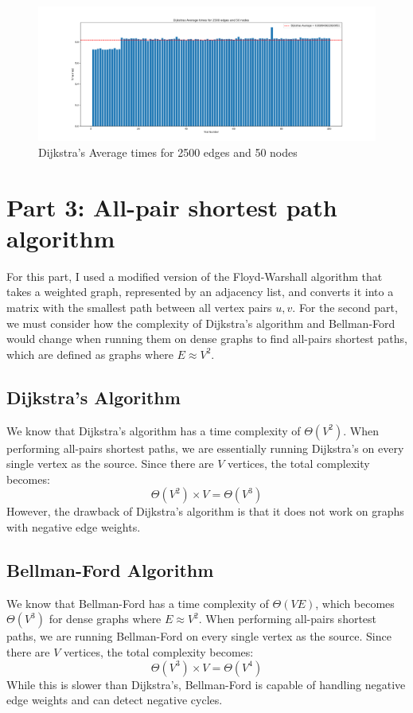 \documentclass[12pt]{article}
\begin{document}
\begin{figure}[H]
    \centering
    \includegraphics[width=\textwidth]{images/Dijkstras Average times for 2500 edges and 50 nodes.png}
    \caption{Dijkstra's Average times for 2500 edges and 50 nodes}
\end{figure}

\newpage
\section*{Part 3: All-pair shortest path algorithm}
For this part, I used a modified version of the Floyd-Warshall algorithm that takes a weighted graph, represented by an adjacency list, and converts it into a matrix with the smallest path between all vertex pairs \(u, v\).\newline
\newline
For the second part, we must consider how the complexity of Dijkstra's algorithm and Bellman-Ford would change when running them on dense graphs to find all-pairs shortest paths, which are defined as graphs where \(E \approx V^2\).

\subsection*{Dijkstra's Algorithm}
We know that Dijkstra's algorithm has a time complexity of \(\Theta(V^2)\). When performing all-pairs shortest paths, we are essentially running Dijkstra's on every single vertex as the source. Since there are \(V\) vertices, the total complexity becomes:
\[
\Theta(V^2) \times V = \Theta(V^3)
\]
However, the drawback of Dijkstra's algorithm is that it does not work on graphs with negative edge weights.

\subsection*{Bellman-Ford Algorithm}
We know that Bellman-Ford has a time complexity of \(\Theta(VE)\), which becomes \(\Theta(V^3)\) for dense graphs where \(E \approx V^2\). When performing all-pairs shortest paths, we are running Bellman-Ford on every single vertex as the source. Since there are \(V\) vertices, the total complexity becomes:
\[
\Theta(V^3) \times V = \Theta(V^4)
\]
While this is slower than Dijkstra's, Bellman-Ford is capable of handling negative edge weights and can detect negative cycles.
\end{document}
